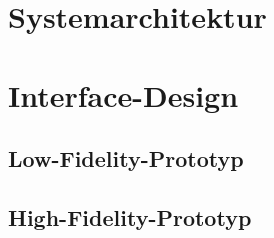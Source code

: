 \section{Systemarchitektur}

\section{Interface-Design}

\subsection{Low-Fidelity-Prototyp}

\subsection{High-Fidelity-Prototyp}